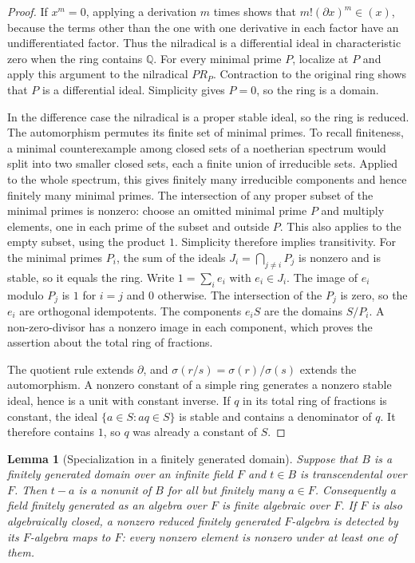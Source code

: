 \documentclass[11pt,oneside,openany]{book}
\newtheorem{lemma}[theorem]{Lemma}
\theoremstyle{definition}
\theoremstyle{remark}
\begin{document}
\begin{proof}
If \(x^m=0\), applying a derivation \(m\) times shows that
\(m!(\partial x)^m\in(x)\), because the terms other than the one
with one derivative in each factor have an undifferentiated factor.
Thus the nilradical is a differential ideal in characteristic zero
when the ring contains \(\mathbb Q\). For every minimal prime \(P\),
localize at \(P\) and apply this argument to the nilradical \(PR_P\).
Contraction to the original ring shows that \(P\) is a differential
ideal. Simplicity gives \(P=0\), so the ring is a domain.

In the difference case the nilradical is a proper stable ideal, so
the ring is reduced. The automorphism permutes its finite set of
minimal primes. To recall finiteness, a minimal counterexample
among closed sets of a noetherian spectrum would split into two
smaller closed sets, each a finite union of irreducible sets.
Applied to the whole spectrum, this gives finitely many
irreducible components and hence finitely many minimal primes.
The intersection of any proper subset of the
minimal primes is nonzero: choose an omitted minimal prime \(P\)
and multiply elements, one in each prime of the subset and outside
\(P\). This also applies to the empty subset, using the product \(1\).
Simplicity therefore implies transitivity. For the minimal primes
\(P_i\), the sum of the ideals \(J_i=\bigcap_{j\ne i}P_j\) is nonzero
and is stable, so it equals the ring. Write \(1=\sum_i e_i\) with
\(e_i\in J_i\). The image of \(e_i\) modulo \(P_j\) is \(1\) for
\(i=j\) and \(0\) otherwise. The intersection of the \(P_j\) is zero,
so the \(e_i\) are orthogonal idempotents. The components \(e_iS\)
are the domains \(S/P_i\). A non-zero-divisor has a nonzero image
in each component, which proves the assertion about the total
ring of fractions.

The quotient rule extends \(\partial\), and
\(\sigma(r/s)=\sigma(r)/\sigma(s)\) extends the automorphism.
A nonzero constant of a simple ring generates a nonzero stable
ideal, hence is a unit with constant inverse. If \(q\) in its total
ring of fractions is constant, the ideal
\(\{a\in S:aq\in S\}\) is stable and contains a denominator of \(q\).
It therefore contains \(1\), so \(q\) was already a constant of \(S\).
\end{proof}

\begin{lemma}[Specialization in a finitely generated domain]
\label{res:PV04}
Suppose that \(B\) is a finitely generated domain over an infinite
field \(F\) and \(t\in B\) is transcendental over \(F\).
Then \(t-a\) is a nonunit of \(B\) for all but finitely many \(a\in F\).
Consequently a field finitely generated as an algebra over \(F\)
is finite algebraic over \(F\). If \(F\) is also algebraically
closed, a nonzero reduced finitely generated \(F\)-algebra
is detected by its \(F\)-algebra maps to \(F\): every nonzero
element is nonzero under at least one of them.
\end{lemma}
\end{document}
